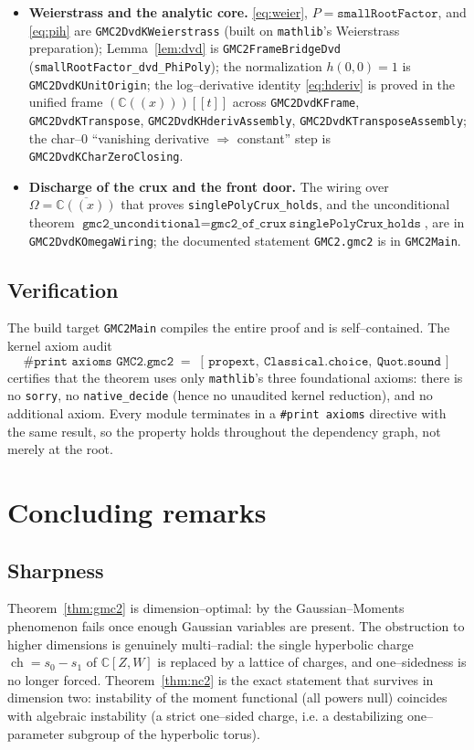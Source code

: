 \documentclass[11pt,reqno]{amsart}
\theoremstyle{plain}
\theoremstyle{definition}
\newcommand{\C}{\mathbb{C}}
\newcommand{\ch}{\operatorname{ch}}
\begin{document}
\begin{itemize}[leftmargin=1.4em]
\texttt{Finset.prod\_bij}), \texttt{GMC2FrameBridge}, \texttt{GMC2FrameBridgeAssembly}.
\item \textbf{Weierstrass and the analytic core.} \eqref{eq:weier}, $P=\texttt{smallRootFactor}$, and
\eqref{eq:pih} are \texttt{GMC2DvdKWeierstrass} (built on \texttt{mathlib}'s Weierstrass preparation);
Lemma~\ref{lem:dvd} is \texttt{GMC2FrameBridgeDvd} (\texttt{smallRootFactor\_dvd\_PhiPoly});
the normalization $h(0,0)=1$ is \texttt{GMC2DvdKUnitOrigin}; the log--derivative identity
\eqref{eq:hderiv} is proved in the unified frame $(\C(\!(x)\!))[\![t]\!]$ across
\texttt{GMC2DvdKFrame}, \texttt{GMC2DvdKTranspose}, \texttt{GMC2DvdKHderivAssembly},
\texttt{GMC2DvdKTransposeAssembly}; the char--$0$ ``vanishing derivative $\Rightarrow$ constant'' step is
\texttt{GMC2DvdKCharZeroClosing}.
\item \textbf{Discharge of the crux and the front door.} The wiring over
$\Omega=\overline{\C(\!(x)\!)}$ that proves \texttt{singlePolyCrux\_holds}, and the unconditional theorem
$\texttt{gmc2\_unconditional}=\texttt{gmc2\_of\_crux}\ \texttt{singlePolyCrux\_holds}$, are in
\texttt{GMC2DvdKOmegaWiring}; the documented statement \texttt{GMC2.gmc2} is in \texttt{GMC2Main}.
\end{itemize}

\subsection*{Verification}
The build target \texttt{GMC2Main} compiles the entire proof and is self--contained. The kernel
axiom audit
\[
  \texttt{\#print axioms GMC2.gmc2}\;=\;[\,\mathtt{propext},\ \mathtt{Classical.choice},\ \mathtt{Quot.sound}\,]
\]
certifies that the theorem uses only \texttt{mathlib}'s three foundational axioms: there is no
\texttt{sorry}, no \texttt{native\_decide} (hence no unaudited kernel reduction), and no additional
axiom. Every module terminates in a \texttt{\#print axioms} directive with the same result, so the
property holds throughout the dependency graph, not merely at the root.

\section{Concluding remarks}\label{sec:remarks}

\subsection*{Sharpness}
Theorem~\ref{thm:gmc2} is dimension--optimal: by \cite{DerksenEssenZhao2017} the Gaussian--Moments
phenomenon fails once enough Gaussian variables are present. The obstruction to higher dimensions is
genuinely multi--radial: the single hyperbolic charge $\ch=s_0-s_1$ of $\C[Z,W]$ is replaced by a
lattice of charges, and one--sidedness is no longer forced. Theorem~\ref{thm:nc2} is the exact statement
that survives in dimension two: instability of the moment functional (all powers null) coincides with
algebraic instability (a strict one--sided charge, i.e. a destabilizing one--parameter subgroup of the
hyperbolic torus).
\end{document}
